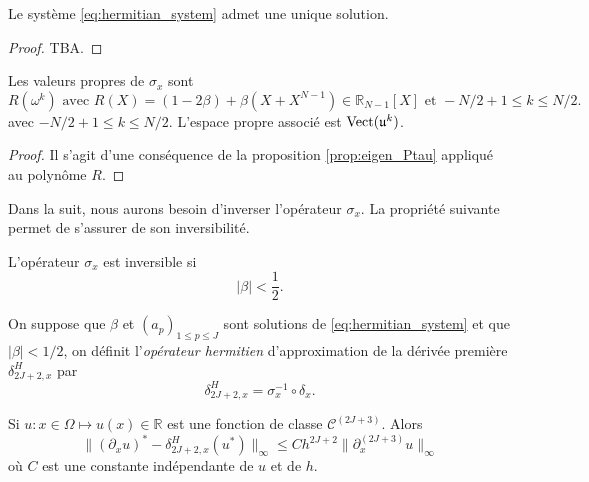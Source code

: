 \begin{proposition}
Le système \eqref{eq:hermitian_system} admet une unique solution.
\end{proposition}

\begin{proof}
TBA.
\end{proof}

\begin{proposition}
Les valeurs propres de $\sigma_x$ sont
\begin{equation}
R(\omega^k) \text{ avec } R(X) = (1-2 \beta) + \beta(X+X^{N-1}) \in \mathbb{R}_{N-1}[X] \text{ et } -N/2+1 \leq k \leq N/2.
\end{equation}
avec $-N/2+1 \leq k \leq N/2$. L'espace propre associé est $\text{Vect} ( \mathfrak{u}^k )$.
\end{proposition}

\begin{proof}
Il s'agit d'une conséquence de la proposition \ref{prop:eigen_Ptau} appliqué au polynôme $R$.
\end{proof}
Dans la suit, nous aurons besoin d'inverser l'opérateur $\sigma_x$. La propriété suivante permet de s'assurer de son inversibilité.
\begin{corollaire}
L'opérateur $\sigma_x$ est inversible si
\begin{equation}
| \beta | < \dfrac{1}{2}.
\end{equation}
\end{corollaire}

\begin{definition}
On suppose que $\beta$ et $(a_p)_{1 \leq p \leq J}$ sont solutions de \eqref{eq:hermitian_system} et que $|\beta| < 1/2$, on définit l'\textit{opérateur hermitien} d'approximation de la dérivée première $\delta_{2J+2,x}^H$ par 
\begin{equation}
\delta_{2J+2,x}^H = \sigma_x^{-1} \circ \delta_{x}.
\end{equation}
\end{definition}

\begin{theoreme}
Si $u : x \in \Omega \mapsto u(x) \in \mathbb{R}$ est une fonction de classe $\mathcal{C}^{(2J+3)}$.
Alors 
\begin{equation}
\| (\partial_x u)^* - \delta_{2J+2,x}^H (u^*) \|_{\infty} \leq C h^{2J+2} \| \partial_x^{(2J+3)} u \|_{\infty}
\end{equation}
où $C$ est une constante indépendante de $u$ et de $h$.
\label{th:consistence_herm2}
\end{theoreme}

